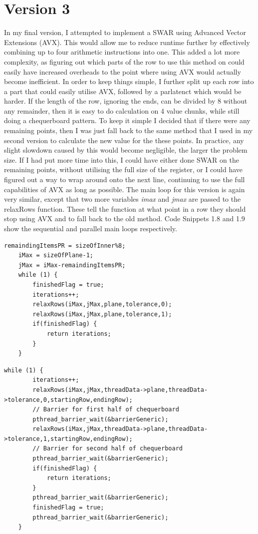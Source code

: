 \documentclass{report}
\begin{document}
\section{Version 3}
In my final version, I attempted to implement a SWAR using Advanced Vector Extensions (AVX). This would allow me to reduce runtime further by effectively combining up to four arithmetic instructions into one. This added a lot more complexity, as figuring out which parts of the row to use this method on could easily have increased overheads to the point where using AVX would actually become inefficient. In order to keep things simple, I further split up each row into a part that could easily utilise AVX, followed by a parlatenct which would be harder. If the length of the row, ignoring the ends, can be divided by 8 without any remainder, then it is easy to do calculation on 4 value chunks, while still doing a chequerboard pattern. To keep it simple I decided that if there were any remaining points, then I was just fall back to the same method that I used in my second version to calculate the new value for the these points. In practice, any slight slowdown caused by this would become negligible, the larger the problem size. If I had put more time into this, I could have either done SWAR on the remaining points, without utilising the full size of the register, or I could have figured out a way to wrap around onto the next line, continuing to use the full capabilities of AVX as long as possible. The main loop for this version is again very similar, except that two more variables \textit{imax} and \textit{jmax} are passed to the relaxRows function. These tell the function at what point in a row they should stop using AVX and to fall back to the old method. Code Snippets 1.8 and 1.9 show the sequential and parallel main loops respectively.\\
\begin{lstlisting}[style=customc,caption=Version 3 Sequential Main Loop]
    remaindingItemsPR = sizeOfInner%8;
    iMax = sizeOfPlane-1;
    jMax = iMax-remaindingItemsPR;
    while (1) {
        finishedFlag = true;
        iterations++;
        relaxRows(iMax,jMax,plane,tolerance,0);
        relaxRows(iMax,jMax,plane,tolerance,1);
        if(finishedFlag) {
            return iterations;
        }
    }
\end{lstlisting}
\pagebreak
\begin{lstlisting}[style=customc,caption=Version 3 Parallel Main Loop]
   while (1) {
        iterations++;
        relaxRows(iMax,jMax,threadData->plane,threadData->tolerance,0,startingRow,endingRow);
        // Barrier for first half of chequerboard
        pthread_barrier_wait(&barrierGeneric);        
        relaxRows(iMax,jMax,threadData->plane,threadData->tolerance,1,startingRow,endingRow);
        // Barrier for second half of chequerboard
        pthread_barrier_wait(&barrierGeneric);
        if(finishedFlag) {
            return iterations;
        }
        pthread_barrier_wait(&barrierGeneric);
        finishedFlag = true;
        pthread_barrier_wait(&barrierGeneric);
    }
\end{lstlisting}
\end{document}
